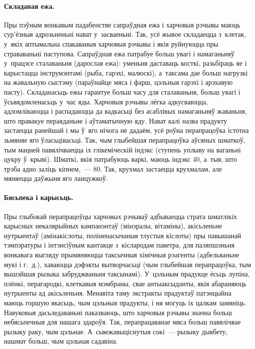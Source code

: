 \paragraph{Складаная ежа.}
Пры пэўным вонкавым падабенстве сапраўдная ежа і харчовыя рэчывы маюць сур'ёзныя адрозьненьні нават у~засваеньні. Так, усё жывое складаецца з~клетак, у~якіх аптымальна спакаваныя харчовыя рэчывы і якія руйнуюцца пры страваваньні паступова. Сапраўдная ежа патрабуе больш увагі і намаганьняў у~працэсе сталаваньня (дарослая ежа): уменьня даставаць косткі, разьбіраць яе і карыстацца інструмэнтамі (рыба, гарэхі, малюскі), а~таксама дае больш нагрузкі на жавальную сыстэму (параўнайце мяса і фарш, цэльныя гарэхі і арэхавую пасту). Складанасьць ежы гарантуе больш часу для сталаваньня, больш увагі і ўсьвядомленасьць у~час яды. Харчовыя рэчывы лёгка адкусваюцца, адломліваюцца і распадаюцца да вадкасьці без асаблівых намаганьняў жаваньня, што правакуе пераяданьне і аўтаматычную яду. Нават калі назва прадукту застаецца ранейшай і мы ў~яго нічога не дадаём, усё роўна перапрацоўка істотна зьмяняе яго ўласьцівасьці. Так, чым глыбейшая перапрацоўка аўсяных шматкоў, тым мацней павялічваецца іх глікеміческій індэкс (ступень уплыву на ваганьні цукру ў~крыві). Шматкі, якія патрабуюць варкі, маюць індэкс 40, а~тыя, што трэба адно заліць кіпнем,~--- 80. Так, крухмал застаецца крухмалам, але мяняецца даўжыня яго ланцужкоў.

\paragraph{Бясьпека і карысьць.}
Пры глыбокай перапрацоўцы харчовых рэчываў адбываецца страта шматлікіх карысных некалярыйных кампанэнтаў (мінэралы, вітаміны), акісьленьне нутрыентаў (амінакіслоты, поліненасычаныя тлустыя кіслоты) пры павышанай тэмпэратуры і інтэнсіўным кантакце з~кіслародам паветра, для паляпшэньня вонкавага выгляду прымяняюцца таксычныя хімічныя рэагенты (адбельваньне мукі і г.~д.), хаваюцца дэфэкты вытворчасьці (чым глыбейшая перапрацоўка, тым вышэйшая рызыка забруджваньня таксынамі). У~цэльным прадукце ёсьць лупіна, плёнкі, перагародкі, клеткавыя мэмбраны, свае антыаксыданты, якія абараняюць нутрыенты ад акісьленьня. Менавіта таму экстракты прадуктаў патэнцыйна маюць горшую якасьць, чым цэльныя прадукты, і ня могуць іх цалкам замяніць. Навуковыя дасьледаваньні паказваюць, што харчовыя рэчывы значна больш небясьпечныя для нашага здароўя. Так, перапрацаванае мяса больш павялічвае рызыку раку, чым цэльнае. А~сьвежавыціснутыя сокі~--- рызыку дыябету, нашмат больш, чым цэльная садавіна.

